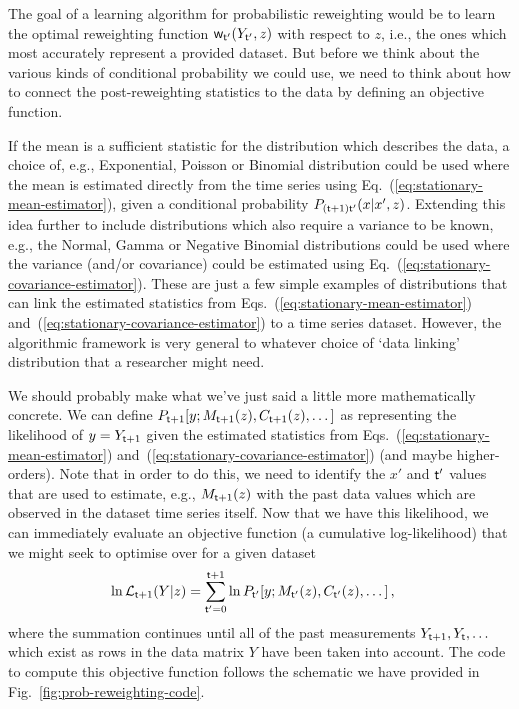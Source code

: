 The goal of a learning algorithm for probabilistic reweighting would be to learn the optimal reweighting function ${\sf w}_{{\sf t}'}(Y_{{\sf t}'},z)$ with respect to $z$, i.e., the ones which most accurately represent a provided dataset. But before we think about the various kinds of conditional probability we could use, we need to think about how to connect the post-reweighting statistics to the data by defining an objective function. 

If the mean is a sufficient statistic for the distribution which describes the data, a choice of, e.g., Exponential, Poisson or Binomial distribution could be used where the mean is estimated directly from the time series using Eq.~(\ref{eq:stationary-mean-estimator}), given a conditional probability $P_{({\sf t}+1){\sf t}'}(x\vert x',z)$. Extending this idea further to include distributions which also require a variance to be known, e.g., the Normal, Gamma or Negative Binomial distributions could be used where the variance (and/or covariance) could be estimated using Eq.~(\ref{eq:stationary-covariance-estimator}). These are just a few simple examples of distributions that can link the estimated statistics from Eqs.~(\ref{eq:stationary-mean-estimator}) and~(\ref{eq:stationary-covariance-estimator}) to a time series dataset. However, the algorithmic framework is very general to whatever choice of `data linking' distribution that a researcher might need.

We should probably make what we've just said a little more mathematically concrete. We can define $P_{{\sf t}+1}[y;M_{{\sf t}+1}(z),C_{{\sf t}+1}(z),\dots ]$ as representing the likelihood of $y = Y_{{\sf t}+1}$ given the estimated statistics from Eqs.~(\ref{eq:stationary-mean-estimator}) and~(\ref{eq:stationary-covariance-estimator}) (and maybe higher-orders). Note that in order to do this, we need to identify the $x'$ and ${\sf t}'$ values that are used to estimate, e.g., $M_{{\sf t}+1}(z)$ with the past data values which are observed in the dataset time series itself. Now that we have this likelihood, we can immediately evaluate an objective function (a cumulative log-likelihood) that we might seek to optimise over for a given dataset 
\begin{align}
\ln {\cal L}_{{\sf t}+1}(Y\vert z) &= \sum_{{\sf t}'=0}^{{\sf t}+1} \ln P_{{\sf t}'}[y;M_{{\sf t}'}(z),C_{{\sf t}'}(z),\dots ] \,, \label{eq:log-likelihood-reweighting}
\end{align}
where the summation continues until all of the past measurements $Y_{{\sf t}+1}, Y_{{\sf t}}, \dots$ which exist as rows in the data matrix $Y$ have been taken into account. The code to compute this objective function follows the schematic we have provided in Fig.~\ref{fig:prob-reweighting-code}.

